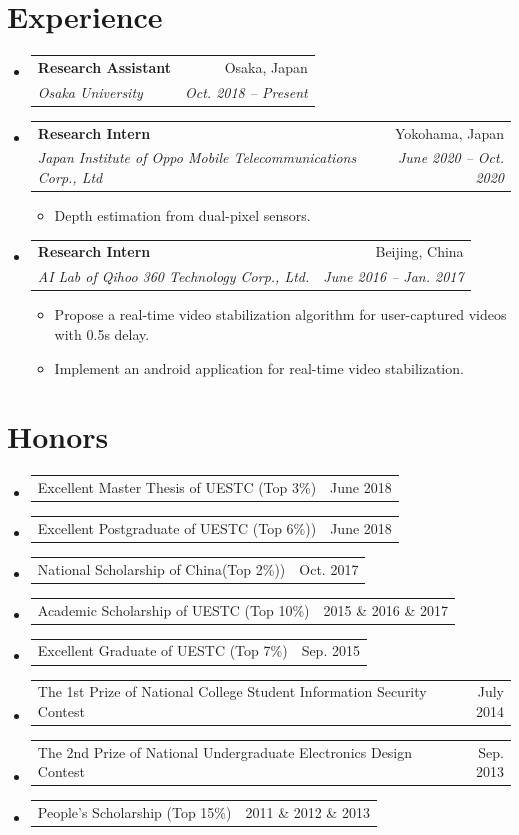 \documentclass[UTF8]{ctexart}
\makeatletter
\newcommand{\resumeItem}[1]{
  \item\small{
    {#1 \vspace{-2pt}}
  }
}
\newcommand{\resumeSubheading}[4]{
  \vspace{-2pt}\item
    \begin{tabular*}{0.97\textwidth}[t]{l@{\extracolsep{\fill}}r}
      \textbf{#1} & #2 \\
      \textit{\small#3} & \textit{\small #4} \\
    \end{tabular*}\vspace{-7pt}
}
\newcommand{\resumeProjectHeading}[2]{
    \item
    \begin{tabular*}{0.97\textwidth}{l@{\extracolsep{\fill}}r}
      \small#1 & #2 \\
    \end{tabular*}\vspace{-7pt}
}
\newcommand{\resumeSubHeadingListStart}{\begin{itemize}[leftmargin=0.15in, label={}]}
\newcommand{\resumeSubHeadingListEnd}{\end{itemize}}
\newcommand{\resumeItemListStart}{\begin{itemize}}
\newcommand{\resumeItemListEnd}{\end{itemize}\vspace{-5pt}}
\makeatother
\begin{document}
\section{Experience}
  \resumeSubHeadingListStart
    \resumeSubheading
      {Research Assistant}{Osaka, Japan}
      {Osaka University}{Oct. 2018 -- Present}
      
    
	
	\resumeSubheading
	{Research Intern}{Yokohama, Japan}
	{Japan Institute of Oppo Mobile Telecommunications Corp., Ltd}{June 2020 -- Oct. 2020}
	\resumeItemListStart
	\resumeItem{Depth estimation from dual-pixel sensors.}
     \resumeItemListEnd

	\resumeSubheading
	{Research Intern}{Beijing, China}
	{AI Lab of Qihoo 360 Technology Corp., Ltd.}{June 2016 -- Jan. 2017}
	\resumeItemListStart
	\resumeItem{Propose a real-time video stabilization algorithm for user-captured videos with 0.5s delay.}
	\resumeItem{Implement an android application for real-time video stabilization.}
	\resumeItemListEnd
  \resumeSubHeadingListEnd


\section{Honors}
    \resumeSubHeadingListStart
      \resumeProjectHeading
          {Excellent Master Thesis of UESTC (Top 3\%)}{June 2018}
   
         \resumeProjectHeading
   {Excellent Postgraduate of UESTC (Top 6\%))}{June 2018}
         \resumeProjectHeading
   {National Scholarship of China(Top 2\%))}{Oct. 2017}
         \resumeProjectHeading
   {Academic Scholarship of UESTC (Top 10\%)}{2015 \& 2016 \& 2017}
         \resumeProjectHeading
   {Excellent Graduate of UESTC (Top 7\%)}{Sep. 2015}
         \resumeProjectHeading
   {The 1st Prize of National College Student Information Security Contest}{July 2014}
            \resumeProjectHeading
   {The 2nd Prize of National Undergraduate Electronics Design Contest}{Sep. 2013}
   \resumeProjectHeading
   {People's Scholarship (Top 15\%)}{2011 \& 2012 \& 2013}
    \resumeSubHeadingListEnd

\end{document}
